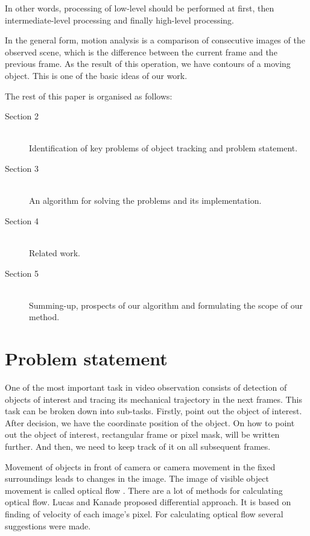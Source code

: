 \documentclass[12pt,a4paper,oneside,titlepage]{article}
\begin{document}
In other words, processing of low-level should be performed at first, then intermediate-level processing and finally high-level processing.

In the general form, motion analysis is a comparison of consecutive images of the observed scene, which is the difference between the current frame and the previous frame.
As the result of this operation, we have contours of a moving object.
This is one of the basic ideas of our work.

The rest of this paper is organised as follows:
\begin{description}
  \item[Section 2] \hfill \\
  Identification of key problems of object tracking and problem statement.
  \item[Section 3] \hfill \\
  An algorithm for solving the problems and its implementation. 
  \item[Section 4] \hfill \\
  Related work.
  \item[Section 5] \hfill \\
  Summing-up, prospects of our algorithm and formulating the scope of our method.
\end{description}

\newpage
\section*{Problem statement}
One of the most important task in video observation consists of detection of objects of interest and tracing its mechanical trajectory in the next frames.
This task can be broken down into sub-tasks.
Firstly, point out the object of interest.
After decision, we have the coordinate position of the object.
On how to point out the object of interest, rectangular frame or pixel mask, will be written further.
And then, we need to keep track of it on all subsequent frames.


Movement of objects in front of camera or camera movement in the fixed surroundings leads to changes in the image.
The image of visible object movement is called optical flow \cite{opticalflow}.
There are a lot of methods for calculating optical flow.
Lucas and Kanade \cite{lucasKanade} proposed differential approach.
It is based on finding of velocity of each image's pixel.
For calculating optical flow several suggestions were made.
\end{document}
